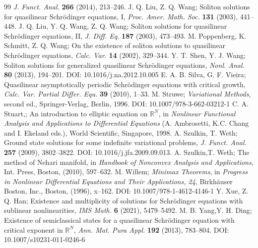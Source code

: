 \documentclass[10pt,a4paper]{amsart}
\numberwithin{equation}{section}
\begin{document}
\begin{thebibliography}{99}
\emph{J. Funct. Anal.} \textbf{266}  (2014), 213--246.
  J. Q. Liu, Z. Q. Wang;
Soliton solutions for quasilinear Schr\"odinger equations, I, 
\emph{Proc. Amer. Math. Soc.} \textbf{131} (2003), 441--448.
  J. Q. Liu, Y. Q. Wang, Z. Q. Wang;
Soliton solutions for quasilinear Schr\"odinger equations, II, 
\emph{J. Diff. Eq.} \textbf{187} (2003), 473--493.
  M. Poppenberg, K. Schmitt, Z. Q. Wang;
On the existence of soliton solutions to quasilinear Schr\"odinger equations, 
\emph{Calc. Var.} \textbf{14} (2002), 329--344.
  Y. T. Shen, Y. J. Wang;
Soliton solutions for generalized quasilinear Schr\"odinger equations, 
\emph{Nonl. Anal.} \textbf{80} (2013), 194--201. DOI: 10.1016/j.na.2012.10.005
  E. A. B. Silva, G. F. Vieira;
Quasilinear asymptotically periodic Schr\"odinger equations with critical growth, 
\emph{Calc. Var. Partial Differ. Equ.} \textbf{39} (2010), 1–33.
  M. Struwe;
\emph{Variational Methods}, second ed., Springer-Verlag, Berlin, 1996. DOI: 10.1007/978-3-662-03212-1
  C. A. Stuart,;
An introduction to elliptic equation on ${\mathbb{R}^N}$, in \emph{Nonlinear Functional Analysis and Applications to Differential Equations} (A. Ambrosetti, K.C. Chang and I. Ekeland eds.), 
World Scientific, Singapore, 1998.
  A. Szulkin, T. Weth;
Ground state solutions for some indefinite variational problems, 
\emph{J. Funct. Anal.} \textbf{257}  (2009), 3802--3822. DOI: 10.1016/j.jfa.2009.09.013.
  A. Szulkin,T. Weth;
The method of Nehari manifold, in \emph{Handbook of Nonconvex Analysis and Applications}, 
Int. Press, Boston, (2010), 597–632.
  M. Willem;
\emph{Minimax Theorems}, in \emph{Progress in Nonlinear Differential Equations and Their Applications, 24}, 
Birkhäuser Boston, Inc., Boston, (1996), x--162. DOI: 10.1007/978-1-4612-4146-1
  Y. Xue, Z. Q. Han;
 Existence and multiplicity of solutions for Schr\"odinger equations with sublinear nonlinearities, 
 \emph{IMS Math.} \textbf{6} (2021), 5479--5492.
  M. B. Yang,Y. H. Ding;
Existence of semiclassical states for a quasilinear Schr\"odinger equation with critical 
exponent in ${\mathbb{R}^N}$, 
\emph{Ann. Mat. Pura Appl.} \textbf{192} (2013), 783--804. DOI: 10.1007/s10231-011-0246-6
\end{thebibliography}
\end{document}
